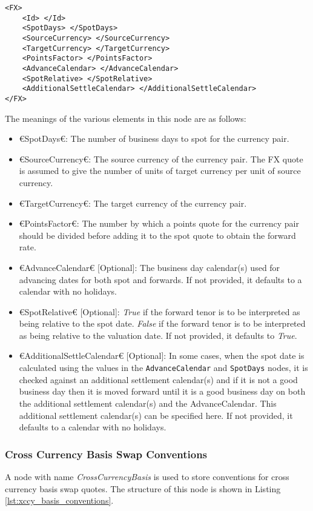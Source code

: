 {\footnotesize
\begin{lstlisting}[caption={FX conventions}, label=lst:fx_conventions]
<FX>
	<Id> </Id>
	<SpotDays> </SpotDays>
	<SourceCurrency> </SourceCurrency>
	<TargetCurrency> </TargetCurrency>
	<PointsFactor> </PointsFactor>
	<AdvanceCalendar> </AdvanceCalendar>
	<SpotRelative> </SpotRelative>
	<AdditionalSettleCalendar> </AdditionalSettleCalendar>
</FX>
\end{lstlisting}
}

The meanings of the various elements in this node are as follows:
\begin{itemize}
\item €SpotDays€: The number of business days to spot for the currency pair.
\item €SourceCurrency€: The source currency of the currency pair. The FX quote is assumed to give the number of units of 
target currency per unit of source currency.
\item €TargetCurrency€: The target currency of the currency pair.
\item €PointsFactor€: The number by which a points quote for the currency pair should be divided before adding it to the 
spot quote to obtain the forward rate.
\item €AdvanceCalendar€ [Optional]: The business day calendar(s) used for advancing dates for both spot and forwards. If not 
provided, it defaults to a calendar with no holidays.
\item €SpotRelative€ [Optional]: \emph{True} if the forward tenor is to be interpreted as being relative to the spot date. 
\emph{False} if the forward tenor is to be interpreted as being relative to the valuation date. If not provided, it 
defaults to \emph{True}.
\item €AdditionalSettleCalendar€ [Optional]: In some cases, when the spot date is calculated using the values in the 
\lstinline!AdvanceCalendar! and \lstinline!SpotDays! nodes, it is checked against an additional settlement calendar(s) and 
if it is not a good business day then it is moved forward until it is a good business day on both the additional 
settlement calendar(s) and the AdvanceCalendar. This additional settlement calendar(s) can be specified here. If not 
provided, it defaults to a calendar with no holidays.
\end{itemize}

\subsubsection{Cross Currency Basis Swap Conventions}
A node with name \emph{CrossCurrencyBasis} is used to store conventions for cross currency basis swap quotes. The 
structure of this node is shown in Listing \ref{lst:xccy_basis_conventions}.


